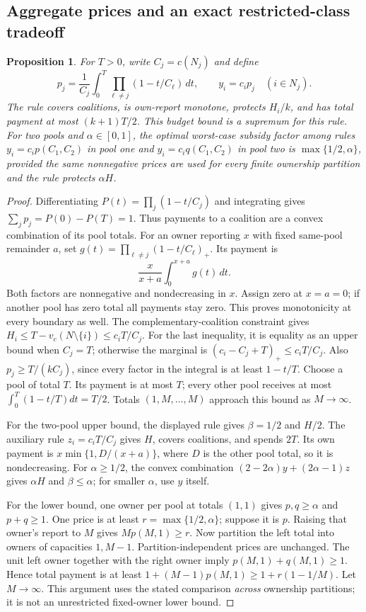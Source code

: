\documentclass[11pt]{article}
\newtheorem{proposition}[theorem]{Proposition}
\theoremstyle{definition}\newtheorem{definition}[theorem]{Definition}
\theoremstyle{remark}\newtheorem{remark}[theorem]{Remark}
\begin{document}
\subsection{Aggregate prices and an exact restricted-class tradeoff}
\begin{proposition}\label{hist:aggregate}
For $T>0$, write $C_j=c(N_j)$ and define
\[
 p_j=\frac1{C_j}\int_0^T\prod_{\ell\ne j}(1-t/C_\ell)\,dt,
 \qquad y_i=c_ip_j\quad(i\in N_j).
\]
The rule covers coalitions, is own-report monotone, protects $H_i/k$, and
has total payment at most $(k+1)T/2$. This budget bound is a supremum for
this rule. For two pools and $\alpha\in[0,1]$, the optimal worst-case
subsidy factor among rules $y_i=c_ip(C_1,C_2)$ in pool one and
$y_i=c_iq(C_1,C_2)$ in pool two is
$\max\{1/2,\alpha\}$, provided the same nonnegative prices are used for
\emph{every} finite ownership partition and the rule protects $\alpha H$.
\end{proposition}
\begin{proof}
Differentiating $P(t)=\prod_j(1-t/C_j)$ and integrating gives
$\sum_jp_j=P(0)-P(T)=1$. Thus payments to a coalition are a convex
combination of its pool totals. For an owner reporting $x$ with fixed
same-pool remainder $a$, set
$g(t)=\prod_{\ell\ne j}(1-t/C_\ell)_+$. Its payment is
\[
 \frac{x}{x+a}\int_0^{x+a}g(t)\,dt.
\]
Both factors are nonnegative and nondecreasing in $x$. Assign zero at
$x=a=0$; if another pool has zero total all payments stay zero. This proves
monotonicity at every boundary as well.
The complementary-coalition constraint gives
$H_i\le T-v_c(N\setminus\{i\})\le c_iT/C_j$.
For the last inequality, it is equality as an upper bound when $C_j=T$;
otherwise the marginal is $(c_i-C_j+T)_+\le c_iT/C_j$.
Also $p_j\ge T/(kC_j)$, since every factor in the integral is at least
$1-t/T$. Choose a pool of total $T$. Its payment is at most $T$;
every other pool receives at most $\int_0^T(1-t/T)dt=T/2$.
Totals $(1,M,\ldots,M)$ approach this bound as $M\to\infty$.

For the two-pool upper bound, the displayed rule gives $\beta=1/2$ and
$H/2$. The auxiliary rule $z_i=c_iT/C_j$ gives $H$, covers coalitions,
and spends $2T$. Its own payment is $x\min\{1,D/(x+a)\}$, where $D$ is
the other pool total, so it is nondecreasing. For $\alpha\ge1/2$, the
convex combination $(2-2\alpha)y+(2\alpha-1)z$ gives $\alpha H$ and
$\beta\le\alpha$; for smaller $\alpha$, use $y$ itself.

For the lower bound, one owner per pool at totals $(1,1)$ gives
$p,q\ge\alpha$ and $p+q\ge1$. One price is at least
$r=\max\{1/2,\alpha\}$; suppose it is $p$.
Raising that owner's report to $M$ gives $Mp(M,1)\ge r$.
Now partition the left total into owners of capacities $1,M-1$.
Partition-independent prices are unchanged. The unit left owner together
with the right owner imply $p(M,1)+q(M,1)\ge1$. Hence total payment is
at least $1+(M-1)p(M,1)\ge1+r(1-1/M)$. Let $M\to\infty$.
This argument uses the stated comparison \emph{across} ownership
partitions; it is not an unrestricted fixed-owner lower bound.
\end{proof}
\end{document}

